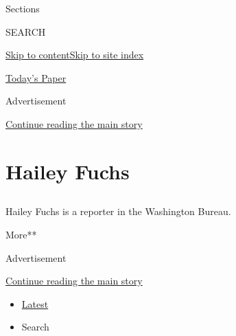 Sections

SEARCH

\protect\hyperlink{site-content}{Skip to
content}\protect\hyperlink{site-index}{Skip to site index}

\href{https://myaccount.nytimes3xbfgragh.onion/auth/login?response_type=cookie\&client_id=vi}{}

\href{https://www.nytimes3xbfgragh.onion/section/todayspaper}{Today's
Paper}

Advertisement

\protect\hyperlink{after-top}{Continue reading the main story}

\hypertarget{hailey-fuchs}{%
\section{Hailey Fuchs}\label{hailey-fuchs}}

\subsection{}

Hailey Fuchs is a reporter in the Washington Bureau.

More**

Advertisement

\protect\hyperlink{after-mid1}{Continue reading the main story}

\begin{itemize}
\tightlist
\item
  \protect\hyperlink{stream-panel}{Latest}
\item
  Search
\end{itemize}

